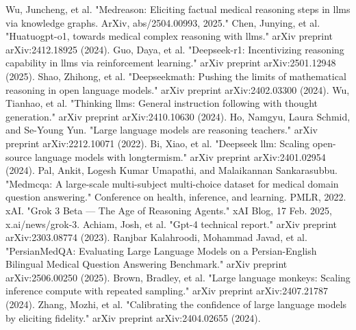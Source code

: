 \documentclass[conference]{IEEEtran}
\begin{document}
\begin{thebibliography}{00}
             Wu, Juncheng, et al. "Medreason: Eliciting factual medical reasoning steps in llms via knowledge graphs. ArXiv, abs/2504.00993, 2025."
             Chen, Junying, et al. "Huatuogpt-o1, towards medical complex reasoning with llms." arXiv preprint arXiv:2412.18925 (2024).
             Guo, Daya, et al. "Deepseek-r1: Incentivizing reasoning capability in llms via reinforcement learning." arXiv preprint arXiv:2501.12948 (2025).
             Shao, Zhihong, et al. "Deepseekmath: Pushing the limits of mathematical reasoning in open language models." arXiv preprint arXiv:2402.03300 (2024).
             Wu, Tianhao, et al. "Thinking llms: General instruction following with thought generation." arXiv preprint arXiv:2410.10630 (2024).
             Ho, Namgyu, Laura Schmid, and Se-Young Yun. "Large language models are reasoning teachers." arXiv preprint arXiv:2212.10071 (2022).
             Bi, Xiao, et al. "Deepseek llm: Scaling open-source language models with longtermism." arXiv preprint arXiv:2401.02954 (2024).
             Pal, Ankit, Logesh Kumar Umapathi, and Malaikannan Sankarasubbu. "Medmcqa: A large-scale multi-subject multi-choice dataset for medical domain question answering." Conference on health, inference, and learning. PMLR, 2022.
             xAI. "Grok 3 Beta — The Age of Reasoning Agents." xAI Blog, 17 Feb. 2025, x.ai/news/grok-3.
             Achiam, Josh, et al. "Gpt-4 technical report." arXiv preprint arXiv:2303.08774 (2023).
             Ranjbar Kalahroodi, Mohammad Javad, et al. "PersianMedQA: Evaluating Large Language Models on a Persian-English Bilingual Medical Question Answering Benchmark." arXiv preprint arXiv:2506.00250 (2025).
             Brown, Bradley, et al. "Large language monkeys: Scaling inference compute with repeated sampling." arXiv preprint arXiv:2407.21787 (2024).
             Zhang, Mozhi, et al. "Calibrating the confidence of large language models by eliciting fidelity." arXiv preprint arXiv:2404.02655 (2024).
            
         
	\end{thebibliography}
	
	
\end{document}
